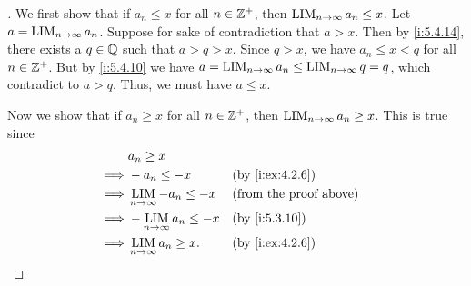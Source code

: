 \begin{proof}[]
  We first show that if \(a_n \leq x\) for all \(n \in \mathbb{Z}^+\), then \(\operatorname*{LIM}_{n \to \infty} a_n \leq x\).
  Let \(a = \operatorname*{LIM}_{n \to \infty} a_n\).
  Suppose for sake of contradiction that \(a > x\).
  Then by \cref{i:5.4.14}, there exists a \(q \in \mathbb{Q}\) such that \(a > q > x\).
  Since \(q > x\), we have \(a_n \leq x < q\) for all \(n \in \mathbb{Z}^+\).
  But by \cref{i:5.4.10} we have \(a = \operatorname*{LIM}_{n \to \infty} a_n \leq \operatorname*{LIM}_{n \to \infty} q = q\), which contradict to \(a > q\).
  Thus, we must have \(a \leq x\).

  Now we show that if \(a_n \geq x\) for all \(n \in \mathbb{Z}^+\), then \(\operatorname*{LIM}_{n \to \infty} a_n \geq x\).
  This is true since
  \begin{align*}
             & a_n \geq x                                                          \\
    \implies & -a_n \leq -x                     &  & \by{i:ex:4.2.6}               \\
    \implies & \LIM_{n \to \infty} -a_n \leq -x &  & \text{(from the proof above)} \\
    \implies & -\LIM_{n \to \infty} a_n \leq -x &  & \by{i:5.3.10}                 \\
    \implies & \LIM_{n \to \infty} a_n \geq x.  &  & \by{i:ex:4.2.6}
  \end{align*}
\end{proof}
